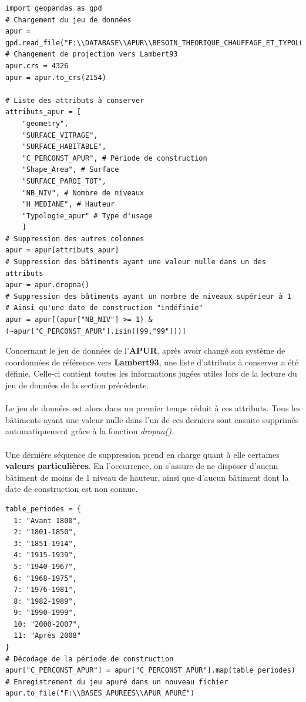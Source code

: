 \documentclass[
  11pt,
  french,
]{article}
\begin{document}
\begin{tcolorbox}[title= Apurement du jeu de données issu de l'APUR ,colback=boitecode]
\begin{lstlisting}[style=code]
import geopandas as gpd
# Chargement du jeu de données
apur = gpd.read_file("F:\\DATABASE\\APUR\\BESOIN_THEORIQUE_CHAUFFAGE_ET_TYPOLOGIE_AU_BATI.geojson")
# Changement de projection vers Lambert93
apur.crs = 4326
apur = apur.to_crs(2154)

# Liste des attributs à conserver
attributs_apur = [
    "geometry",
    "SURFACE_VITRAGE",
    "SURFACE_HABITABLE",
    "C_PERCONST_APUR", # Période de construction
    "Shape_Area", # Surface
    "SURFACE_PAROI_TOT",
    "NB_NIV", # Nombre de niveaux
    "H_MEDIANE", # Hauteur
    "Typologie_apur" # Type d'usage
    ]
# Suppression des autres colonnes
apur = apur[attributs_apur]
# Suppression des bâtiments ayant une valeur nulle dans un des attributs
apur = apur.dropna()
# Suppression des bâtiments ayant un nombre de niveaux supérieur à 1
# Ainsi qu'une date de construction "indéfinie"
apur = apur[(apur["NB_NIV"] >= 1) & (~apur["C_PERCONST_APUR"].isin([99,"99"]))]\end{lstlisting}
\end{tcolorbox}

Concernant le jeu de données de l'\textbf{APUR}, après avoir changé son
système de coordonnées de référence vers \textbf{Lambert93}, une liste
d'attributs à conserver a été définie. Celle-ci contient toutes les
informations jugées utiles lors de la lecture du jeu de données de la
section précédente.\\
~\\
Le jeu de données est alors dans un premier temps réduit à ces
attributs. Tous les bâtiments ayant une valeur nulle dans l'un de ces
derniers sont ensuite supprimés automatiquement grâce à la fonction
\emph{dropna()}.\\
~\\
Une dernière séquence de suppression prend en charge quant à elle
certaines \textbf{valeurs particulières}. En l'occurrence, on s'assure
de ne disposer d'aucun bâtiment de moins de 1 niveau de hauteur, ainsi
que d'aucun bâtiment dont la date de construction est non connue.

\begin{tcolorbox}[title= Décodage des attributs ,colback=boitecode]
\begin{lstlisting}[style=code]
table_periodes = {
  1: "Avant 1800",
  2: "1801-1850",
  3: "1851-1914",
  4: "1915-1939",
  5: "1940-1967",
  6: "1968-1975",
  7: "1976-1981",
  8: "1982-1989",
  9: "1990-1999",
  10: "2000-2007",
  11: "Après 2008"
}
# Décodage de la période de construction
apur["C_PERCONST_APUR"] = apur["C_PERCONST_APUR"].map(table_periodes)
# Enregistrement du jeu apuré dans un nouveau fichier
apur.to_file("F:\\BASES_APUREES\\APUR_APURÉ")\end{lstlisting}
\end{tcolorbox}
\end{document}
